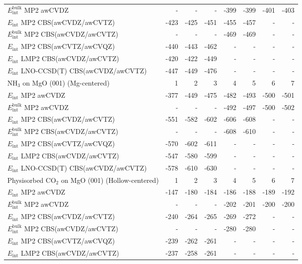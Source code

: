 \begin{longtable}{lrrrrrrr}
$E_\textrm{int}^\textrm{bulk}$ MP2 awCVDZ & - & - & - & -399 & -399 & -401 & -403 \\
$E_\textrm{int}$ MP2 CBS(awCVDZ/awCVTZ) & -423 & -425 & -451 & -455 & -457 & - & - \\
$E_\textrm{int}^\textrm{bulk}$ MP2 CBS(awCVDZ/awCVTZ) & - & - & - & -469 & -469 & - & - \\
$E_\textrm{int}$ MP2 CBS(awCVTZ/awCVQZ) & -440 & -443 & -462 & - & - & - & - \\
$E_\textrm{int}$ LMP2 CBS(awCVDZ/awCVTZ) & -420 & -422 & -449 & - & - & - & - \\
$E_\textrm{int}$ LNO-CCSD(T) CBS(awCVDZ/awCVTZ) & -447 & -449 & -476 & - & - & - & - \\
\toprule
NH$_3$ on MgO (001) (Mg-centered) & 1 & 2 & 3 & 4 & 5 & 6 & 7 \\ 
\midrule
$E_\textrm{int}$ MP2 awCVDZ & -377 & -449 & -475 & -482 & -493 & -500 & -501 \\
$E_\textrm{int}^\textrm{bulk}$ MP2 awCVDZ & - & - & - & -492 & -497 & -500 & -502 \\
$E_\textrm{int}$ MP2 CBS(awCVDZ/awCVTZ) & -551 & -582 & -602 & -606 & -608 & - & - \\
$E_\textrm{int}^\textrm{bulk}$ MP2 CBS(awCVDZ/awCVTZ) & - & - & - & -608 & -610 & - & - \\
$E_\textrm{int}$ MP2 CBS(awCVTZ/awCVQZ) & -570 & -602 & -611 & - & - & - & - \\
$E_\textrm{int}$ LMP2 CBS(awCVDZ/awCVTZ) & -547 & -580 & -599 & - & - & - & - \\
$E_\textrm{int}$ LNO-CCSD(T) CBS(awCVDZ/awCVTZ) & -578 & -610 & -630 & - & - & - & - \\
\toprule
Physisorbed CO$_2$ on MgO (001) (Hollow-centered) & 1 & 2 & 3 & 4 & 5 & 6 & 7 \\ 
\midrule
$E_\textrm{int}$ MP2 awCVDZ & -147 & -180 & -184 & -186 & -188 & -189 & -192 \\
$E_\textrm{int}^\textrm{bulk}$ MP2 awCVDZ & - & - & - & -202 & -201 & -200 & -200 \\
$E_\textrm{int}$ MP2 CBS(awCVDZ/awCVTZ) & -240 & -264 & -265 & -269 & -272 & - & - \\
$E_\textrm{int}^\textrm{bulk}$ MP2 CBS(awCVDZ/awCVTZ) & - & - & - & -280 & -280 & - & - \\
$E_\textrm{int}$ MP2 CBS(awCVTZ/awCVQZ) & -239 & -262 & -261 & - & - & - & - \\
$E_\textrm{int}$ LMP2 CBS(awCVDZ/awCVTZ) & -237 & -258 & -261 & - & - & - & - \\

\end{longtable}
